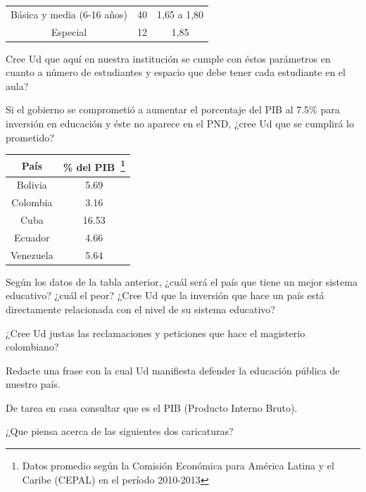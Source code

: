 \documentclass[10pt,twoside]{article}
\begin{document}
\begin{enumerate}
\begin{center}
\begin{tabular}{|c|p{3.5cm}|c|}
Básica y media (6-16 años) & \hspace*{1cm}40 & 1,65 a 1,80 \\ 
Especial & \hspace*{1cm}12 & 1,85 \\ \hline
\end{tabular} 
\end{center}
Cree Ud que aquí en nuestra institución se cumple con éstos parámetros en cuanto a número de estudiantes y espacio que debe tener cada estudiante en el aula?
\item Si el gobierno se comprometió a aumentar el porcentaje del PIB al 7.5\% para inversión en educación y éste no aparece en el PND, ¿cree Ud que se cumplirá lo prometido?
\begin{minipage}{.4\textwidth}
\begin{center}
\begin{tabular}{|c|c|}
\hline 
País & \% del PIB~\footnote{Datos promedio según la Comisión Económica para América Latina y el Caribe (CEPAL) en el período 2010-2013} \\ 
\hline 
Bolivia & 5.69 \\ 
\hline 
Colombia & 3.16 \\ 
\hline 
Cuba & 16.53 \\ 
\hline 
Ecuador & 4.66 \\ 
\hline 
Venezuela & 5.64 \\ 
\hline 
\end{tabular}
\end{center}
\end{minipage}
\begin{minipage}{.55\textwidth}
\item Según los datos de la tabla anterior, ¿cuál será el país que tiene un mejor sistema educativo? ¿cuál el peor? ¿Cree Ud que la inversión que hace un país está directamente relacionada con el nivel de su sistema educativo?
\end{minipage}
\item ¿Cree Ud justas las reclamaciones y peticiones que hace el magisterio colombiano?
\item Redacte una frase con la cual Ud manifiesta defender la educación pública de nuestro país.
\item De tarea en casa consultar que es el PIB (Producto Interno Bruto).
\item ¿Que piensa acerca de las siguientes dos caricaturas?


\end{enumerate}
\end{document}
